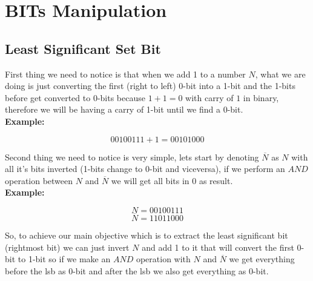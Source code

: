 \documentclass[twoside]{book}
\begin{document}


\thispagestyle{empty}
\cleardoublepage
\tableofcontents
\newpage
\thispagestyle{empty}
\cleardoublepage
\begin{multicols*}{2}
\end{multicols*}
{
[\vspace{2em}]
\part*{BITs Manipulation}
}
{
\chapter*{Least Significant Set Bit}
}
\vspace{1em}
\sffamily
\bgroup

First thing we need to notice is that when we add 1 to a number $N$, what we are doing is just converting the first (right to left) 0-bit into a 1-bit and
the 1-bits before get converted to 0-bits because $1 + 1 = 0$ with carry of $1$ in binary, therefore we will be having a carry of 1-bit until we find a 0-bit.\\

\textbf{Example:}

$$00100111 + 1 = 00101000$$

Second thing we need to notice is very simple, lets start by denoting $\overline{N}$ as $N$ with all it's bits inverted (1-bits change to 0-bit and viceversa), if we perform an $AND$ operation between $N$ and $\overline{N}$ we will get all bits in $0$ as result.\\

\textbf{Example:}

$$N = 00100111$$
$$\overline{N} = 11011000$$

So, to achieve our main objective which is to extract the least significant bit (rightmost bit) we can just invert $N$ and add 1 to it that will convert the first 0-bit to 1-bit so if we make an $AND$ operation with $N$ and $\overline{N}$ we get everything before the lsb as 0-bit and after the lsb we also get everything as 0-bit.\\
\end{document}
